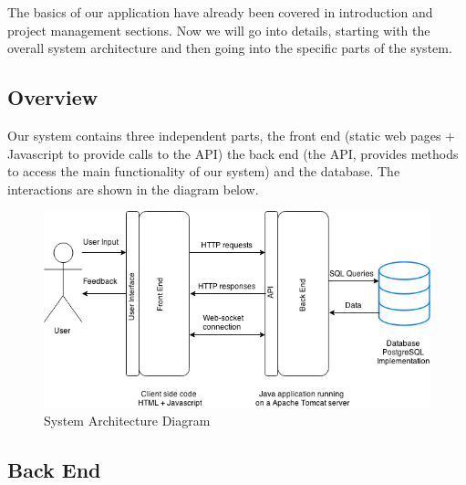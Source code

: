 \documentclass[10pt,a4paper]{article}
\begin{document}
The basics of our application have already been covered in introduction and 
project management sections. Now we will go into details, starting with the 
overall system architecture and then going into the specific parts of the 
system.

\subsection{Overview}

\noindent Our system contains three independent parts, the front end (static web 
pages + Javascript to provide calls to the API) the back end (the API, provides 
methods to access the main functionality of our system) and the database. The 
interactions are shown in the diagram below.

\begin{figure}[H]
\centerline{\includegraphics[scale=0.58,trim=0 0 100 0]{sysarch}}
\caption{System Architecture Diagram}
\end{figure}    


\subsection{Back End}
\end{document}
